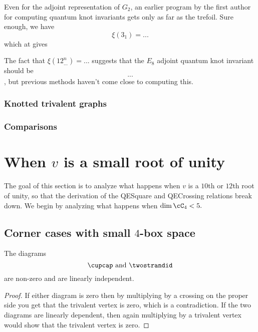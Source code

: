 \documentclass[12pt]{amsart}
\begin{document}
Even for the adjoint representation of $G_2$, an earlier program by the first
author for computing quantum knot invariants gets only as far as the trefoil. 
Sure enough, we have
$$\xi(3_1) = ...$$
which at  gives 


The fact that $\xi(12^n_{...}) = ...$ suggests that the $E_8$ adjoint quantum 
knot invariant should be $$...$$, but previous methods haven't come close to
computing this.

\subsubsection{Knotted trivalent graphs}\mbox{}%

\subsubsection{Comparisons}


\section{When $v$ is a small root of unity}

The goal of this section is to analyze what happens when $v$ is a $10$th or $12$th root of unity, so that the derivation of the QESquare and QECrossing relations break down.  We begin by analyzing what happens when $\dim \cC_4 < 5.$


\subsection{Corner cases with small $4$-box space}

\begin{lemma}
The diagrams
$$\cupcap \text{ and } \twostrandid$$
are non-zero and are linearly independent.
\end{lemma}
\begin{proof}
If either diagram is zero then by multiplying by a crossing on the proper side you get that the trivalent vertex is zero, which is a contradiction.  If the two diagrams are linearly dependent, then again multiplying by a trivalent vertex would show that the trivalent vertex is zero.
\end{proof}
\end{document}
